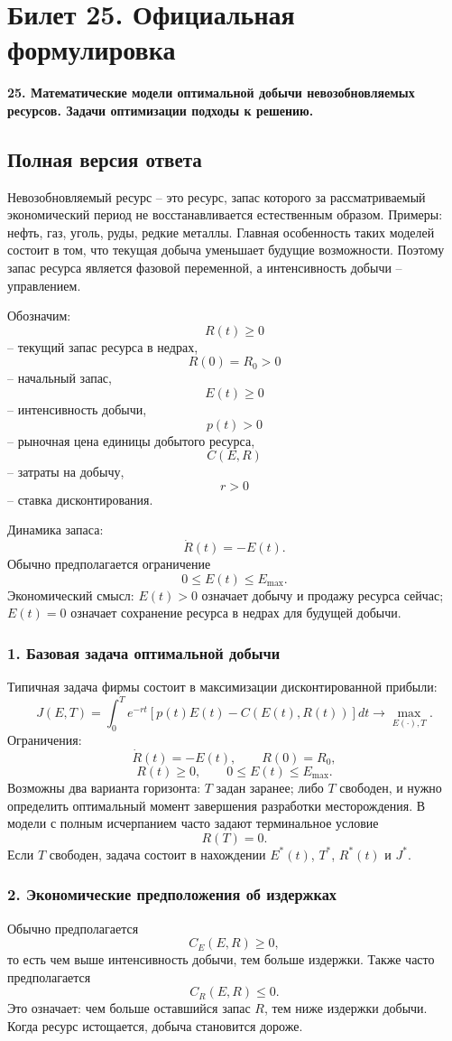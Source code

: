 \documentclass[12pt,a4paper]{article}
\begin{document}
\section{Билет 25. Официальная формулировка}
\textbf{25. Математические модели оптимальной добычи невозобновляемых ресурсов. Задачи оптимизации подходы к решению.}

\subsection{Полная версия ответа}
Невозобновляемый ресурс -- это ресурс, запас которого за рассматриваемый экономический период не восстанавливается естественным образом. Примеры: нефть, газ, уголь, руды, редкие металлы. Главная особенность таких моделей состоит в том, что текущая добыча уменьшает будущие возможности. Поэтому запас ресурса является фазовой переменной, а интенсивность добычи -- управлением.

Обозначим:
\[
R(t)\ge 0
\]
-- текущий запас ресурса в недрах,
\[
R(0)=R_0>0
\]
-- начальный запас,
\[
E(t)\ge 0
\]
-- интенсивность добычи,
\[
p(t)>0
\]
-- рыночная цена единицы добытого ресурса,
\[
C(E,R)
\]
-- затраты на добычу,
\[
r>0
\]
-- ставка дисконтирования.

Динамика запаса:
\[
\dot R(t)=-E(t).
\]
Обычно предполагается ограничение
\[
0\le E(t)\le E_{\max}.
\]
Экономический смысл: $E(t)>0$ означает добычу и продажу ресурса сейчас; $E(t)=0$ означает сохранение ресурса в недрах для будущей добычи.

\subsubsection*{1. Базовая задача оптимальной добычи}
Типичная задача фирмы состоит в максимизации дисконтированной прибыли:
\[
J(E,T)=\int_0^T e^{-rt}\left[p(t)E(t)-C(E(t),R(t))\right]dt\to \max_{E(\cdot),T}.
\]
Ограничения:
\[
\dot R(t)=-E(t),\qquad R(0)=R_0,
\]
\[
R(t)\ge 0,
\qquad
0\le E(t)\le E_{\max}.
\]
Возможны два варианта горизонта: $T$ задан заранее; либо $T$ свободен, и нужно определить оптимальный момент завершения разработки месторождения. В модели с полным исчерпанием часто задают терминальное условие
\[
R(T)=0.
\]
Если $T$ свободен, задача состоит в нахождении $E^*(t)$, $T^*$, $R^*(t)$ и $J^*$.

\subsubsection*{2. Экономические предположения об издержках}
Обычно предполагается
\[
C_E(E,R)\ge 0,
\]
то есть чем выше интенсивность добычи, тем больше издержки. Также часто предполагается
\[
C_R(E,R)\le 0.
\]
Это означает: чем больше оставшийся запас $R$, тем ниже издержки добычи. Когда ресурс истощается, добыча становится дороже.
\end{document}
